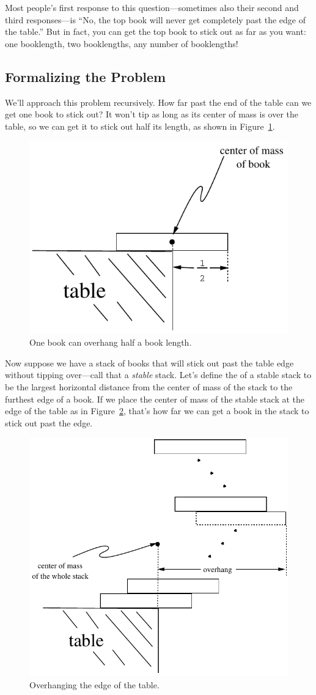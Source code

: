 Most people's first response to this question---sometimes also their
second and third responses---is ``No, the top book will never get
completely past the edge of the table.''  But in fact, you can get the top
book to stick out as far as you want: one booklength, two booklengths, any
number of booklengths!

\subsection{Formalizing the Problem}

We'll approach this problem recursively.  How far past the end of the
table can we get one book to stick out?  It won't tip as long as its
center of mass is over the table, so we can get it to stick out half its
length, as shown in Figure~\ref{one-stable-book}.

\begin{figure}[htbp]
\centerline{\includegraphics[width=.40\textwidth]{figures/bookstack-3}}
\caption{One book can overhang half a book length.}
\label{one-stable-book}
\end{figure}

Now suppose we have a stack of books that will stick out past the table
edge without tipping over---call that a \emph{stable} stack.  Let's define
the  of a stable stack to be the largest horizontal
distance from the center of mass of the stack to the furthest edge of a
book.  If we place the center of mass of the stable stack at the edge of
the table as in Figure~\ref{overhang}, that's how far we can get a book in
the stack to stick out past the edge.

\begin{figure}
\centerline{\includegraphics[width=.4\textwidth]{figures/bookstack-2}}
\caption{Overhanging the edge of the table.}
\label{overhang}
\end{figure}

